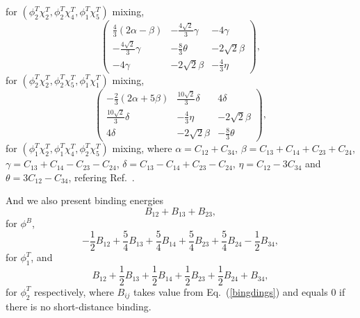 \documentclass[prd,twocolumn,floatfix,nofootinbib]{revtex4}
\begin{document}
for $(\phi_{2}^{T}\chi_{2}^{T},\phi_{2}^{T}\chi_{4}^{T},\phi_{1}^{T}\chi_{5}^{T})$ mixing,
\begin{equation}\label{221mixing254}
    \begin{pmatrix}
        \frac{4}{3}(2\alpha-\beta)  & -\frac{4\sqrt{2}}{3}\gamma    & -4\gamma \\
        -\frac{4\sqrt{2}}{3}\gamma  & -\frac{8}{3}\theta            & -2\sqrt{2}\beta \\
        -4\gamma                    & -2\sqrt{2}\beta               & -\frac{4}{3}\eta
    \end{pmatrix},
\end{equation}
for $(\phi_{2}^{T}\chi_{2}^{T},\phi_{2}^{T}\chi_{5}^{T},\phi_{1}^{T}\chi_{1}^{T})$ mixing,
\begin{equation}\label{112mixing245}
    \begin{pmatrix}
        -\frac{2}{3}(2\alpha+5\beta)    & \frac{10\sqrt{2}}{3}\delta    & 4\delta \\
        \frac{10\sqrt{2}}{3}\delta      & -\frac{4}{3}\eta              & -2\sqrt{2}\beta \\
        4\delta                         & -2\sqrt{2}\beta               & -\frac{8}{3}\theta
    \end{pmatrix},
\end{equation}
for $(\phi_{1}^{T}\chi_{2}^{T},\phi_{1}^{T}\chi_{4}^{T},\phi_{2}^{T}\chi_{5}^{T})$ mixing,
where $\alpha=C_{12}+C_{34}$, $\beta=C_{13}+C_{14}+C_{23}+C_{24}$, $\gamma=C_{13}+C_{14}-C_{23}-C_{24}$, $\delta=C_{13}-C_{14}+C_{23}-C_{24}$,
$\eta=C_{12}-3C_{34}$ and $\theta=3C_{12}-C_{34}$, refering Ref.~\cite{Luo:2017eub}.

And we also present binding energies
\begin{equation}
    B_{12}+B_{13}+B_{23},
\end{equation}
for $\phi^{B}$,
\begin{equation}\label{ph1binding}
    -\frac{1}{2}B_{12}+\frac{5}{4}B_{13}+\frac{5}{4}B_{14}+\frac{5}{4}B_{23}+\frac{5}{4}B_{24}-\frac{1}{2}B_{34},
\end{equation}
for $\phi_{1}^{T}$, and
\begin{equation}\label{ph2binding}
    B_{12}+\frac{1}{2}B_{13}+\frac{1}{2}B_{14}+\frac{1}{2}B_{23}+\frac{1}{2}B_{24}+B_{34},
\end{equation}
for $\phi_{2}^{T}$ respectively, where $B_{ij}$ takes value from Eq.~(\ref{bingdings}) and equals 0 if there is no short-distance binding.
\end{document}
